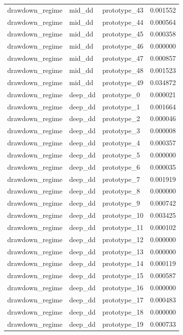 \begin{tabular}{lllr}
drawdown\_regime & mid\_dd & prototype\_43 & 0.001552 \\
drawdown\_regime & mid\_dd & prototype\_44 & 0.000564 \\
drawdown\_regime & mid\_dd & prototype\_45 & 0.000358 \\
drawdown\_regime & mid\_dd & prototype\_46 & 0.000000 \\
drawdown\_regime & mid\_dd & prototype\_47 & 0.000857 \\
drawdown\_regime & mid\_dd & prototype\_48 & 0.001523 \\
drawdown\_regime & mid\_dd & prototype\_49 & 0.034872 \\
drawdown\_regime & deep\_dd & prototype\_0 & 0.000021 \\
drawdown\_regime & deep\_dd & prototype\_1 & 0.001664 \\
drawdown\_regime & deep\_dd & prototype\_2 & 0.000046 \\
drawdown\_regime & deep\_dd & prototype\_3 & 0.000008 \\
drawdown\_regime & deep\_dd & prototype\_4 & 0.000357 \\
drawdown\_regime & deep\_dd & prototype\_5 & 0.000000 \\
drawdown\_regime & deep\_dd & prototype\_6 & 0.000035 \\
drawdown\_regime & deep\_dd & prototype\_7 & 0.001919 \\
drawdown\_regime & deep\_dd & prototype\_8 & 0.000000 \\
drawdown\_regime & deep\_dd & prototype\_9 & 0.000742 \\
drawdown\_regime & deep\_dd & prototype\_10 & 0.003425 \\
drawdown\_regime & deep\_dd & prototype\_11 & 0.000102 \\
drawdown\_regime & deep\_dd & prototype\_12 & 0.000000 \\
drawdown\_regime & deep\_dd & prototype\_13 & 0.000000 \\
drawdown\_regime & deep\_dd & prototype\_14 & 0.000119 \\
drawdown\_regime & deep\_dd & prototype\_15 & 0.000587 \\
drawdown\_regime & deep\_dd & prototype\_16 & 0.000000 \\
drawdown\_regime & deep\_dd & prototype\_17 & 0.000483 \\
drawdown\_regime & deep\_dd & prototype\_18 & 0.000000 \\
drawdown\_regime & deep\_dd & prototype\_19 & 0.000733 \\

\end{tabular}
